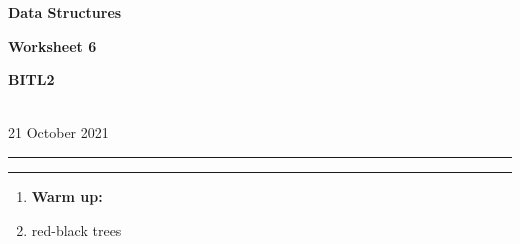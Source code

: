 \documentclass[a4paper,12pt]{article}
\begin{document}
\begin{center}
\parbox{3.5cm}{\textbf{Data Structures}} \hfill {\bf\Huge Worksheet 6} \hfill \parbox{3.5cm}{\flushright\textbf{BITL2}} \\[5pt]
\rm\small 21 October 2021
\end{center}

\hrule\vspace{2pt}\hrule

\begin{enumerate}

\item \textbf{Warm up:}

\item red-black trees



\end{enumerate}
\end{document}
